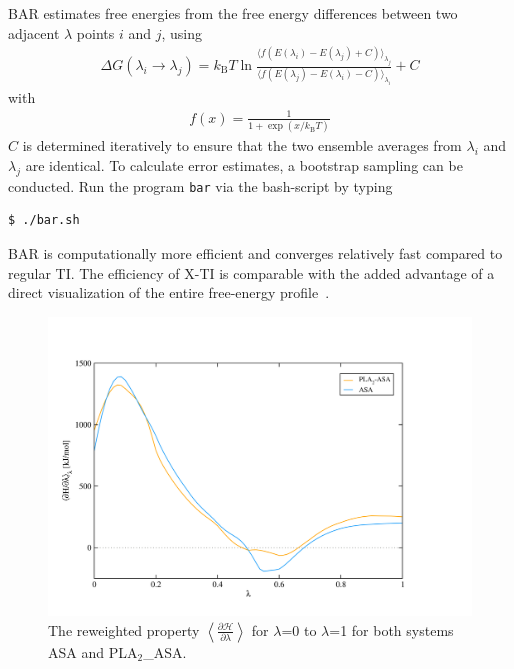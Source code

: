 BAR estimates free energies from the free energy differences between two adjacent $\lambda$ points $i$ and $j$, using
\begin{align}
\Delta G(\lambda_i \rightarrow \lambda_j) 
     = k_{\text{B}} T \ln \frac{\langle f(E(\lambda_i) - E(\lambda_j) + C)\rangle_{\lambda_j}}
          {\langle f(E(\lambda_j)-E(\lambda_i) - C )\rangle_{\lambda_i}}  + C
\end{align}
with
\begin{align}
f(x) = \frac{1}{1+\exp(x/k_{\text{B}} T)}
\end{align}
$C$ is determined iteratively to ensure that the two ensemble averages
from $\lambda_i$ and $\lambda_j$ are identical. To calculate error estimates, a
bootstrap sampling can be conducted. Run the program \texttt{bar} via
the bash-script by typing
\begin{lstlisting}
$ ./bar.sh 
\end{lstlisting}
%
BAR is computationally more efficient and converges relatively fast compared to regular TI. The efficiency of X-TI is comparable with the added advantage of a direct visualization of the entire free-energy profile~\cite{Maurer}.

\begin{figure}[H]
    \centering
    \includegraphics[scale=0.3]{../05_tutorial_02/figures/ana_TI.png}
    \caption{The reweighted property $\left<\frac{\partial\mathcal{H}}{\partial\lambda}\right>$ for $\lambda$=0 to $\lambda$=1 for both systems ASA and PLA$_2$\_ASA.}
    \label{TI_ASA}
\end{figure}

